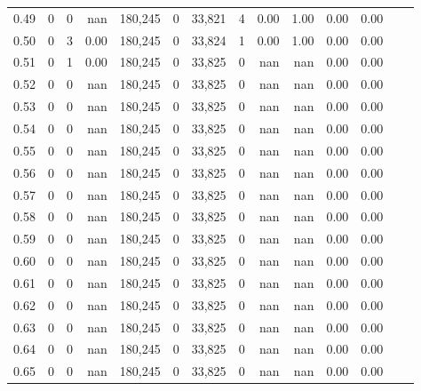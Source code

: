 \begin{tabular}{rrrrrrrrrrrrrr}
0.49 &       0 &      0 &     nan &  180,245 &        0 &  33,821 &       4 &  0.00 &  1.00 &  0.00 &      0.00 \\
0.50 &       0 &      3 &    0.00 &  180,245 &        0 &  33,824 &       1 &  0.00 &  1.00 &  0.00 &      0.00 \\
0.51 &       0 &      1 &    0.00 &  180,245 &        0 &  33,825 &       0 &   nan &   nan &  0.00 &      0.00 \\
0.52 &       0 &      0 &     nan &  180,245 &        0 &  33,825 &       0 &   nan &   nan &  0.00 &      0.00 \\
0.53 &       0 &      0 &     nan &  180,245 &        0 &  33,825 &       0 &   nan &   nan &  0.00 &      0.00 \\
0.54 &       0 &      0 &     nan &  180,245 &        0 &  33,825 &       0 &   nan &   nan &  0.00 &      0.00 \\
0.55 &       0 &      0 &     nan &  180,245 &        0 &  33,825 &       0 &   nan &   nan &  0.00 &      0.00 \\
0.56 &       0 &      0 &     nan &  180,245 &        0 &  33,825 &       0 &   nan &   nan &  0.00 &      0.00 \\
0.57 &       0 &      0 &     nan &  180,245 &        0 &  33,825 &       0 &   nan &   nan &  0.00 &      0.00 \\
0.58 &       0 &      0 &     nan &  180,245 &        0 &  33,825 &       0 &   nan &   nan &  0.00 &      0.00 \\
0.59 &       0 &      0 &     nan &  180,245 &        0 &  33,825 &       0 &   nan &   nan &  0.00 &      0.00 \\
0.60 &       0 &      0 &     nan &  180,245 &        0 &  33,825 &       0 &   nan &   nan &  0.00 &      0.00 \\
0.61 &       0 &      0 &     nan &  180,245 &        0 &  33,825 &       0 &   nan &   nan &  0.00 &      0.00 \\
0.62 &       0 &      0 &     nan &  180,245 &        0 &  33,825 &       0 &   nan &   nan &  0.00 &      0.00 \\
0.63 &       0 &      0 &     nan &  180,245 &        0 &  33,825 &       0 &   nan &   nan &  0.00 &      0.00 \\
0.64 &       0 &      0 &     nan &  180,245 &        0 &  33,825 &       0 &   nan &   nan &  0.00 &      0.00 \\
0.65 &       0 &      0 &     nan &  180,245 &        0 &  33,825 &       0 &   nan &   nan &  0.00 &      0.00 \\

\end{tabular}
